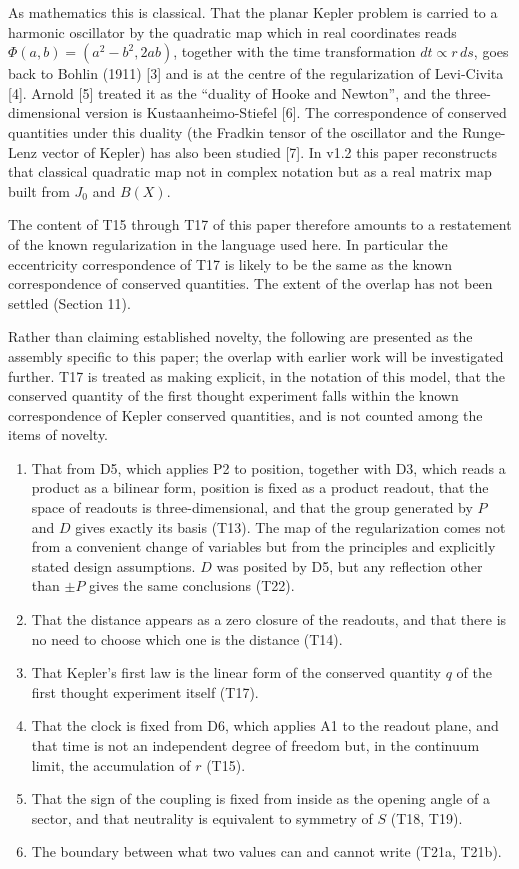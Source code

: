 \documentclass[
  a4paper,
]{article}
\providecommand{\tightlist}{%
  \setlength{\itemsep}{0pt}\setlength{\parskip}{0pt}}
\begin{document}
As mathematics this is classical. That the planar Kepler problem is
carried to a harmonic oscillator by the quadratic map which in real
coordinates reads \(\Phi(a,b)=(a^2-b^2,2ab)\), together with the time
transformation \(dt\propto r\,ds\), goes back to Bohlin (1911) {[}3{]}
and is at the centre of the regularization of Levi-Civita {[}4{]}.
Arnold {[}5{]} treated it as the ``duality of Hooke and Newton'', and
the three-dimensional version is Kustaanheimo-Stiefel {[}6{]}. The
correspondence of conserved quantities under this duality (the Fradkin
tensor of the oscillator and the Runge-Lenz vector of Kepler) has also
been studied {[}7{]}. In v1.2 this paper reconstructs that classical
quadratic map not in complex notation but as a real matrix map built
from \(J_0\) and \(B(X)\).

The content of T15 through T17 of this paper therefore amounts to a
restatement of the known regularization in the language used here. In
particular the eccentricity correspondence of T17 is likely to be the
same as the known correspondence of conserved quantities. The extent of
the overlap has not been settled (Section 11).

Rather than claiming established novelty, the following are presented as
the assembly specific to this paper; the overlap with earlier work will
be investigated further. T17 is treated as making explicit, in the
notation of this model, that the conserved quantity of the first thought
experiment falls within the known correspondence of Kepler conserved
quantities, and is not counted among the items of novelty.

\begin{enumerate}
\def\labelenumi{\arabic{enumi}.}
\tightlist
\item
  That from D5, which applies P2 to position, together with D3, which
  reads a product as a bilinear form, position is fixed as a product
  readout, that the space of readouts is three-dimensional, and that the
  group generated by \(P\) and \(D\) gives exactly its basis (T13). The
  map of the regularization comes not from a convenient change of
  variables but from the principles and explicitly stated design
  assumptions. \(D\) was posited by D5, but any reflection other than
  \(\pm P\) gives the same conclusions (T22).
\item
  That the distance appears as a zero closure of the readouts, and that
  there is no need to choose which one is the distance (T14).
\item
  That Kepler's first law is the linear form of the conserved quantity
  \(q\) of the first thought experiment itself (T17).
\item
  That the clock is fixed from D6, which applies A1 to the readout
  plane, and that time is not an independent degree of freedom but, in
  the continuum limit, the accumulation of \(r\) (T15).
\item
  That the sign of the coupling is fixed from inside as the opening
  angle of a sector, and that neutrality is equivalent to symmetry of
  \(S\) (T18, T19).
\item
  The boundary between what two values can and cannot write (T21a,
  T21b).
\end{enumerate}
\end{document}

